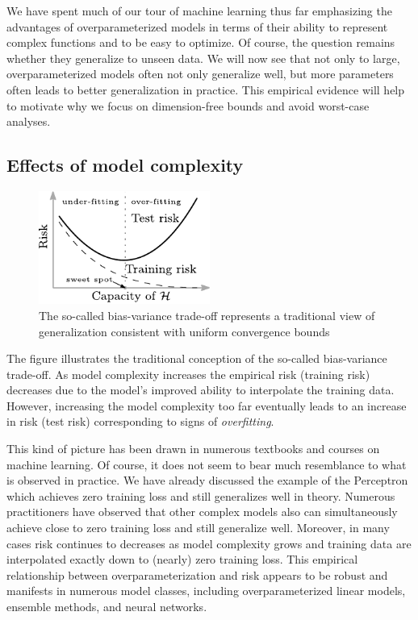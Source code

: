 \documentclass{tufte-book}
\begin{document}

We have spent much of our tour of machine learning thus far emphasizing
the advantages of overparameterized models in terms of their ability to
represent complex functions and to be easy to optimize. Of course, the
question remains whether they generalize to unseen data. We will now see
that not only to large, overparameterized models often not only
generalize well, but more parameters often leads to better
generalization in practice. This empirical evidence will help to
motivate why we focus on dimension-free bounds and avoid worst-case
analyses.

\hypertarget{effects-of-model-complexity}{%
\subsection{Effects of model
complexity}\label{effects-of-model-complexity}}

\begin{figure}
\centering
\includegraphics[width=0.5\textwidth,height=\textheight]{assets/u-shaped}
\caption{The so-called bias-variance trade-off represents a traditional
view of generalization consistent with uniform convergence bounds}
\end{figure}

The figure illustrates the traditional conception of the so-called
bias-variance trade-off. As model complexity increases the empirical
risk (training risk) decreases due to the model's improved ability to
interpolate the training data. However, increasing the model complexity
too far eventually leads to an increase in risk (test risk)
corresponding to signs of \emph{overfitting}.

This kind of picture has been drawn in numerous textbooks and courses on
machine learning. Of course, it does not seem to bear much resemblance
to what is observed in practice. We have already discussed the example
of the Perceptron which achieves zero training loss and still
generalizes well in theory. Numerous practitioners have observed that
other complex models also can simultaneously achieve close to zero
training loss and still generalize well. Moreover, in many cases risk
continues to decreases as model complexity grows and training data are
interpolated exactly down to (nearly) zero training loss. This empirical
relationship between overparameterization and risk appears to be robust
and manifests in numerous model classes, including overparameterized
linear models, ensemble methods, and neural networks.
\end{document}
